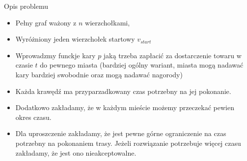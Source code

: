 \begin{block}{Opis problemu}
\begin{itemize}
	\item Pełny graf ważony z $n$ wierzchołkami,
	\item Wyróżniony jeden wierzchołek startowy $v_{start}$
	\item Wprowadzmy funckje kary $p$ jaką trzeba zapłacić za dostarczenie towaru w czasie $t$ do pewnego miasta (bardziej ogólny wariant, miasta mogą nadawać kary bardziej swobodnie oraz mogą nadawać nagorody)
	\item Każda krawędź ma przyparzadkowany czas potrzebny na jej pokonanie.
	\item Dodatkowo zakładamy, że w każdym mieście możemy przeczekać pewien okres czasu.
	\item Dla uproszczenie zakładamy, że jest pewne górne ograniczenie na czas potrzebny na pokonaniem trasy. Jeżeli rozwiązanie potrzebuje więcej czasu zakładamy, że jest ono nieakceptowalne.
\end{itemize}
\end{block}
